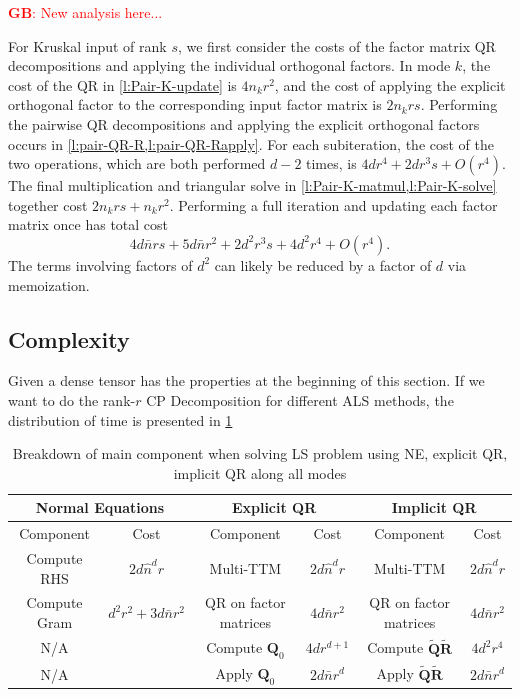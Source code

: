 \documentclass{article}
\newcommand{\mat}[1]{\mathbf{#1}}
\newcommand{\GB}[1]{\textcolor{red}{\textbf{GB}: #1}}
\begin{document}
\GB{New analysis here...}

For Kruskal input of rank $s$, we first consider the costs of the factor matrix QR decompositions and applying the individual orthogonal factors.
In mode $k$, the cost of the QR in \cref{l:Pair-K-update} is $4n_kr^2$, and the cost of applying the explicit orthogonal factor to the corresponding input factor matrix is $2n_krs$.
Performing the pairwise QR decompositions and applying the explicit orthogonal factors occurs in \cref{l:pair-QR-R,l:pair-QR-Rapply}.
For each subiteration, the cost of the two operations, which are both performed $d-2$ times, is $4dr^4+2dr^3s+O(r^4)$.
The final multiplication and triangular solve in \cref{l:Pair-K-matmul,l:Pair-K-solve} together cost $2n_krs+n_kr^2$.
Performing a full iteration and updating each factor matrix once has total cost
$$ 4d\bar{n}rs + 5d\bar{n}r^2 + 2d^2r^3s + 4d^2r^4 + O(r^4). $$
The terms involving factors of $d^2$ can likely be reduced by a factor of $d$ via memoization.

\subsection{Complexity}
Given a dense tensor has the properties at the beginning of this section. 
If we want to do the rank-$r$ CP Decomposition for different ALS methods, the distribution of time is presented in \cref{tab:dense_its_part}


\begin{table}[!ht] 
  \centering
  \begin{tabular}{|c|c|c|c|c|c|}
    \hline
    \multicolumn{2}{|c|}{\textbf{Normal Equations}} & \multicolumn{2}{|c|}{\textbf{Explicit QR}} & \multicolumn{2}{|c|}{\textbf{Implicit QR}} \\
    \hline
    Component & Cost & Component & Cost & Component & Cost \\
    \hline
    Compute RHS &$2d \hat{n}^d r$ &Multi-TTM &$2d\hat n^d r$  & Multi-TTM &$2d\hat n^d r$  \\
    Compute Gram & $d^2r^2 + 3d \bar{n} r^2$&QR on factor matrices & $4d \bar n r^2$ & QR on factor matrices & $4d \bar n r^2$\\
    N/A& &Compute $\mat{Q}_0$ & $4dr^{d+1}$& Compute $\tilde{\mat{Q}}\tilde{\mat{R}}$& $4d^2r^4$\\
    N/A & &Apply $\mat{Q}_0$& $2d\bar n r^d$& Apply $\tilde{\mat{Q}}\tilde{\mat{R}}$& $2d\bar n r^d$\\
    \hline
  \end{tabular}
  \caption{Breakdown of main component when solving LS problem using NE, explicit QR, implicit QR along all modes}
  \label{tab:dense_its_part}
\end{table}
\end{document}
